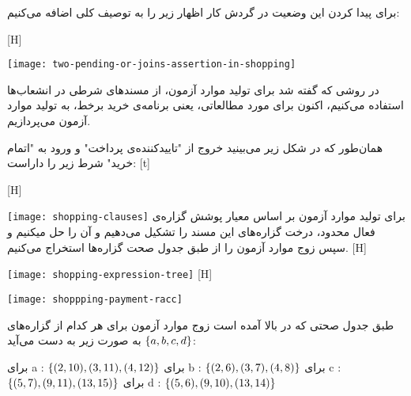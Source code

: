 برای پیدا کردن این وضعیت در گردش کار اظهار زیر را به توصیف کلی اضافه می‌کنیم: \newline\newline



[H]
\raggedright
\texttt{[image: two-pending-or-joins-assertion-in-shopping]}
\vspace{0.5em}



در روشی که گفته شد برای تولید موارد آزمون، از مسندهای شرطی در انشعاب‌ها استفاده می‌کنیم، اکنون برای مورد مطالعاتی‌، یعنی برنامه‌ی خرید برخط، به تولید موارد آزمون می‌پردازیم.

همان‌طور که در شکل زیر می‌بینید خروج از "تاییدکننده‌ی پرداخت" و ورود به "اتمام خرید" شرط زیر را داراست:
[t]
\vspace{0.5em}


[H]
\raggedright
\texttt{[image: shopping-clauses]}
\vspace{0.5em}
برای تولید موارد آزمون بر اساس معیار پوشش گزاره‌ی فعال محدود، درخت گزاره‌های این مسند را تشکیل می‌دهیم و آن را حل میکنیم و سپس زوج موارد آزمون را از طبق جدول صحت گزاره‌ها استخراج می‌کنیم.
[H]
\raggedright
\texttt{[image: shopping-expression-tree]}
\vspace{0.5em}
[H]
\raggedright
\texttt{[image: shoppping-payment-racc]}
\vspace{0.5em}

طبق جدول صحتی که در بالا آمده است زوج‌ موارد آزمون برای هر کدام از گزاره‌های
$\left\{ a, b, c, d \right\}$
به صورت زیر به دست می‌آید:

 برای a : 
$\left\{ (2, 10), (3, 11), (4, 12) \right\}$
 برای b : 
$\left\{ (2, 6), (3, 7), (4, 8) \right\}$
 برای c : 
$\left\{ (5, 7), (9, 11), (13, 15) \right\}$
 برای d : 
$\left\{ (5, 6), (9, 10), (13, 14) \right\}$

